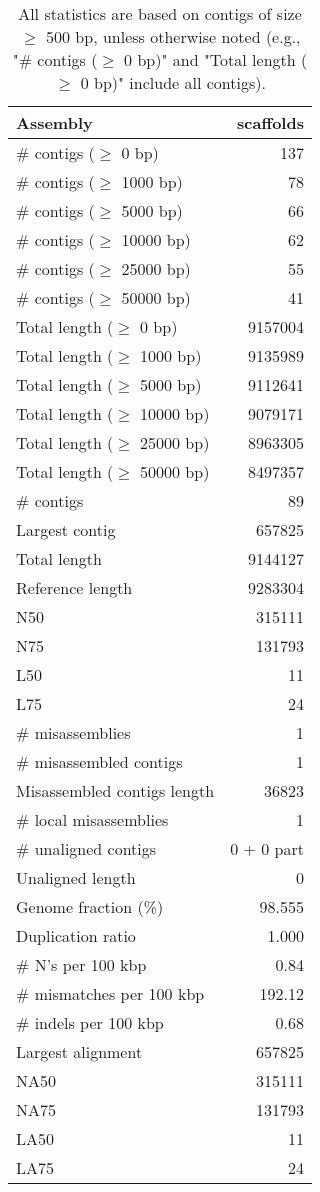 \documentclass[12pt,a4paper]{article}
\begin{document}
\begin{table}[ht]
\begin{center}
\caption{All statistics are based on contigs of size $\geq$ 500 bp, unless otherwise noted (e.g., "\# contigs ($\geq$ 0 bp)" and "Total length ($\geq$ 0 bp)" include all contigs).}
\begin{tabular}{|l*{1}{|r}|}
\hline
Assembly & scaffolds \\ \hline
\# contigs ($\geq$ 0 bp) & 137 \\ \hline
\# contigs ($\geq$ 1000 bp) & 78 \\ \hline
\# contigs ($\geq$ 5000 bp) & 66 \\ \hline
\# contigs ($\geq$ 10000 bp) & 62 \\ \hline
\# contigs ($\geq$ 25000 bp) & 55 \\ \hline
\# contigs ($\geq$ 50000 bp) & 41 \\ \hline
Total length ($\geq$ 0 bp) & 9157004 \\ \hline
Total length ($\geq$ 1000 bp) & 9135989 \\ \hline
Total length ($\geq$ 5000 bp) & 9112641 \\ \hline
Total length ($\geq$ 10000 bp) & 9079171 \\ \hline
Total length ($\geq$ 25000 bp) & 8963305 \\ \hline
Total length ($\geq$ 50000 bp) & 8497357 \\ \hline
\# contigs & 89 \\ \hline
Largest contig & 657825 \\ \hline
Total length & 9144127 \\ \hline
Reference length & 9283304 \\ \hline
N50 & 315111 \\ \hline
N75 & 131793 \\ \hline
L50 & 11 \\ \hline
L75 & 24 \\ \hline
\# misassemblies & 1 \\ \hline
\# misassembled contigs & 1 \\ \hline
Misassembled contigs length & 36823 \\ \hline
\# local misassemblies & 1 \\ \hline
\# unaligned contigs & 0 + 0 part \\ \hline
Unaligned length & 0 \\ \hline
Genome fraction (\%) & 98.555 \\ \hline
Duplication ratio & 1.000 \\ \hline
\# N's per 100 kbp & 0.84 \\ \hline
\# mismatches per 100 kbp & 192.12 \\ \hline
\# indels per 100 kbp & 0.68 \\ \hline
Largest alignment & 657825 \\ \hline
NA50 & 315111 \\ \hline
NA75 & 131793 \\ \hline
LA50 & 11 \\ \hline
LA75 & 24 \\ \hline
\end{tabular}
\end{center}
\end{table}
\end{document}
